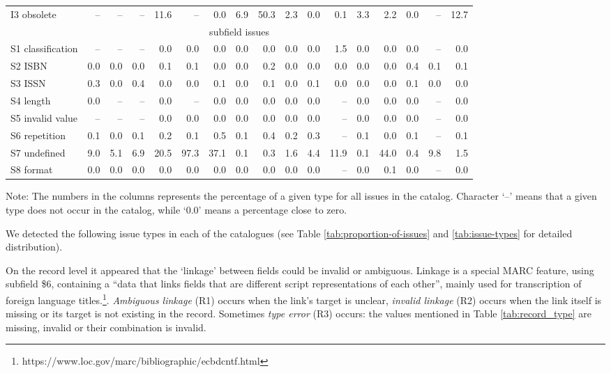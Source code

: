{\begin{landscape}
\begin{table*}
\begin{minipage}{\columnwidth}
\begin{center}
\begin{tabular}{lrrrrrrrrrrrrrrrr}
I3 obsolete & -- & -- & -- & 11.6 & -- & 0.0 & 6.9 & 50.3 & 2.3 & 0.0 & 0.1 & 3.3 & 2.2 & 0.0 & -- & 12.7 \\
\multicolumn{17}{c}{subfield issues} \\
S1 classification & -- & -- & -- & 0.0 & 0.0 & 0.0 & 0.0 & 0.0 & 0.0 & 0.0 & 1.5 & 0.0 & 0.0 & 0.0 & -- & 0.0 \\
S2 ISBN & 0.0 & 0.0 & 0.0 & 0.1 & 0.1 & 0.0 & 0.0 & 0.2 & 0.0 & 0.0 & 0.0 & 0.0 & 0.0 & 0.4 & 0.1 & 0.1 \\
S3 ISSN & 0.3 & 0.0 & 0.4 & 0.0 & 0.0 & 0.1 & 0.0 & 0.1 & 0.0 & 0.1 & 0.0 & 0.0 & 0.0 & 0.1 & 0.0 & 0.0 \\
S4 length & 0.0 & -- & -- & 0.0 & -- & 0.0 & 0.0 & 0.0 & 0.0 & 0.0 & -- & 0.0 & 0.0 & 0.0 & -- & 0.0 \\
S5 invalid value & -- & -- & -- & 0.0 & 0.0 & 0.0 & 0.0 & 0.0 & 0.0 & 0.0 & -- & 0.0 & 0.0 & 0.0 & -- & 0.0 \\
S6 repetition & 0.1 & 0.0 & 0.1 & 0.2 & 0.1 & 0.5 & 0.1 & 0.4 & 0.2 & 0.3 & -- & 0.1 & 0.0 & 0.1 & -- & 0.1 \\
S7 undefined & 9.0 & 5.1 & 6.9 & 20.5 & 97.3 & 37.1 & 0.1 & 0.3 & 1.6 & 4.4 & 11.9 & 0.1 & 44.0 & 0.4 & 9.8 & 1.5 \\
S8 format & 0.0 & 0.0 & 0.0 & 0.0 & 0.0 & 0.0 & 0.0 & 0.0 & 0.0 & 0.0 & -- & 0.0 & 0.1 & 0.0 & -- & 0.0 \\
\bottomrule
\end{tabular}
\end{center}
\footnotesize
Note: The numbers in the columns represents the percentage of a given type for all issues in the catalog. Character `--' means that a given type does not occur in the catalog, while `0.0' means a percentage close to zero.
\end{minipage}
\end{table*}
    \end{landscape}
    \clearpage%
}

We detected the following issue types in each of the catalogues (see Table \ref{tab:proportion-of-issues} and \ref{tab:issue-types} for detailed distribution).

On the record level it appeared that the `linkage' between fields could be invalid or ambiguous. Linkage is a special MARC feature, using subfield \$6, containing  a ``data that links fields that are different script representations of each other'', mainly used for transcription of foreign language titles.\footnote{https://www.loc.gov/marc/bibliographic/ecbdcntf.html}. \emph{Ambiguous linkage} (R1) occurs when the link's target is unclear, \emph{invalid linkage} (R2) occurs when the link itself is missing or its target is not existing in the record. Sometimes \emph{type error} (R3) occurs: the values mentioned in Table \ref{tab:record_type} are missing, invalid or their combination is invalid.

